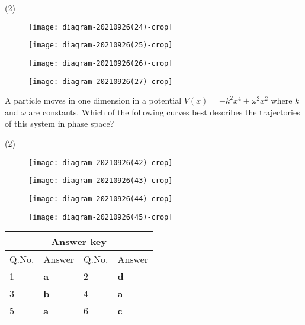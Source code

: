 \begin{enumerate}
\begin{tasks}(2)
	\task[\textbf{A.}]\begin{figure}[H]
		\centering
		\texttt{[image: diagram-20210926(24)-crop]}
	\end{figure}
	\task[\textbf{B.}]\begin{figure}[H]
		\centering
		\texttt{[image: diagram-20210926(25)-crop]}
	\end{figure}
	\task[\textbf{C.}]\begin{figure}[H]
		\centering
		\texttt{[image: diagram-20210926(26)-crop]}
	\end{figure}
	\task[\textbf{D.}]\begin{figure}[H]
		\centering
		\texttt{[image: diagram-20210926(27)-crop]}
	\end{figure}
\end{tasks}
\begin{minipage}{\textwidth}
	\item A particle moves in one dimension in a potential $V(x)=-k^{2} x^{4}+\omega^{2} x^{2}$ where $k$ and $\omega$ are constants. Which of the following curves best describes the trajectories of this system in phase space?
\end{minipage}
\begin{tasks}(2)
	\task[\textbf{A.}]\begin{figure}[H]
		\centering
		\texttt{[image: diagram-20210926(42)-crop]}
	\end{figure}
	\task[\textbf{B.}]\begin{figure}[H]
		\centering
		\texttt{[image: diagram-20210926(43)-crop]}
	\end{figure}
	\task[\textbf{C.}]\begin{figure}[H]
		\centering
		\texttt{[image: diagram-20210926(44)-crop]}
	\end{figure}
	\task[\textbf{D.}]\begin{figure}[H]
		\centering
		\texttt{[image: diagram-20210926(45)-crop]}
	\end{figure}
\end{tasks}
\end{enumerate}
\setlength\arrayrulewidth{1pt}
\begin{table}[H]
	\centering
	
	\begin{tabular}{|p{1.5cm}|p{1.5cm}||p{1.5cm}|p{1.5cm}|}
		\hline
		\multicolumn{4}{|c|}{\textbf{Answer key}}\\\hline\hline
		\rowcolor{ocrel}Q.No.&Answer&Q.No.&Answer\\\hline
		1&\textbf{a}&2&\textbf{d}\\\hline
		3&\textbf{b}&4&\textbf{a}\\\hline
		5&\textbf{a}&6&\textbf{c}\\\hline
	\end{tabular}
\end{table}
